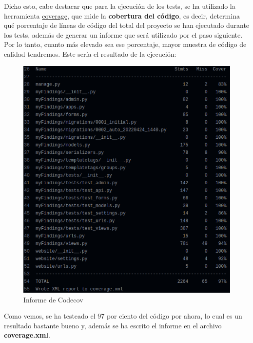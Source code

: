 \begin{enumerate}
\begin{enumerate}
\begin{enumerate}
                        Dicho esto, cabe destacar que para la ejecución de los tests, se ha
                        utilizado la herramienta \href{https://pypi.org/project/coverage/}
                        {coverage}, que mide la \textbf{cobertura del código}, es decir,
                        determina qué porcentaje de líneas de código del total del proyecto
                        se han ejecutado durante los tests, además de generar un informe que
                        será utilizado por el paso siguiente. Por lo tanto, cuanto más
                        elevado sea ese porcentaje, mayor muestra de código de calidad
                        tendremos. Este sería el resultado de la ejecución:

                                \begin{figure}[H]
                                    \centering
                                    \includegraphics[scale=0.41]{imagenes/codecov-report.png}
                                    \caption{Informe de Codecov}
                                    \label{fig:codecov-report}
                                \end{figure}
                        
                        Como vemos, se ha testeado el 97 por ciento del código por ahora, lo
                        cual es un resultado bastante bueno y, además se ha escrito el
                        informe en el archivo \textbf{coverage.xml}.
                        

\end{enumerate}
\end{enumerate}
\end{enumerate}
